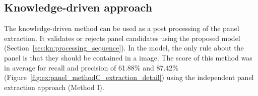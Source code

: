 

\subsection{Knowledge-driven approach} %
The knowledge-driven method can be used as a post processing of the panel extraction.
It validates or rejects panel candidates using the proposed model (Section~\ref{sec:kn:processing_sequence}).
In the model, the only rule about the panel is that they should be contained in a image.
The score of this method was in average for recall and precision of 61.88\% and 87.42\% (Figure~\ref{fig:ex:panel_methodC_extraction_detail}) using the independent panel extraction approach (Method I).



